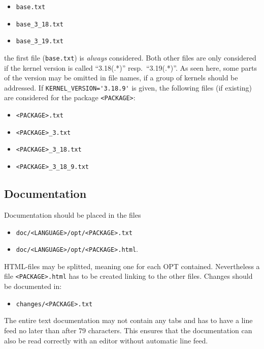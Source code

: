 \begin{itemize}
\item \texttt{base.txt}
\item \texttt{base\_3\_18.txt}
\item \texttt{base\_3\_19.txt}
\end{itemize}

the first file (\texttt{base.txt}) is \emph{always} considered. Both
other files are only considered if the kernel version is called ``3.18(.*)''
resp.\ ``3.19(.*)''. As seen here, some parts of the version may be omitted
in file names, if a group of kernels should be addressed.
If \verb+KERNEL_VERSION='3.18.9'+ is given, the following files (if existing)
are considered for the package \texttt{<PACKAGE>}:

\begin{itemize}
\item \texttt{<PACKAGE>.txt}
\item \texttt{<PACKAGE>\_3.txt}
\item \texttt{<PACKAGE>\_3\_18.txt}
\item \texttt{<PACKAGE>\_3\_18\_9.txt}
\end{itemize}

\subsection{Documentation}

    Documentation should be placed in the files

    \begin{itemize}
    \item \texttt{doc/<LANGUAGE>/opt/<PACKAGE>.txt}
    \item \texttt{doc/<LANGUAGE>/opt/<PACKAGE>.html}.
    \end{itemize}

    HTML-files may be splitted, meaning one for each OPT contained.
    Nevertheless a file \texttt{<PACKAGE>.html} has to be created
    linking to the other files. Changes should be documented in:

    \begin{itemize}
    \item \texttt{changes/<PACKAGE>.txt}
    \end{itemize}

    The entire text documentation may not contain any tabs and has
    to have a line feed no later than after 79 characters. This ensures
    that the documentation can also be read correctly with an editor
    without automatic line feed.

